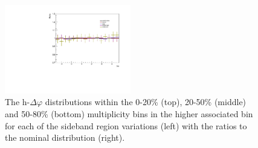 \begin{figure}[ht]
    \includegraphics[width=0.49\textwidth]{figures/analysis/sideband_variations_dphi_50_80_highpt_ratio.pdf}
    \caption{The h-\lmb $\Delta\varphi$ distributions within the 0-20\% (top), 20-50\% (middle) and 50-80\% (bottom) multiplicity bins in the higher associated \pt bin for each of the sideband region variations (left) with the ratios to the nominal distribution (right).}
    \label{fig:sideband_region_variations_highpt}
\end{figure}



